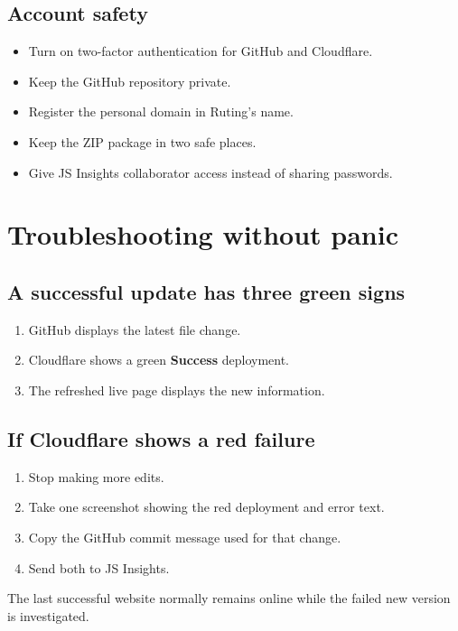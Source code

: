 \documentclass[10pt,a4paper]{article}
\begin{document}
\subsection{Account safety}

\begin{itemize}
  \item Turn on two-factor authentication for GitHub and Cloudflare.
  \item Keep the GitHub repository private.
  \item Register the personal domain in Ruting's name.
  \item Keep the ZIP package in two safe places.
  \item Give JS Insights collaborator access instead of sharing passwords.
\end{itemize}

\clearpage
\section{Troubleshooting without panic}

\subsection{A successful update has three green signs}

\begin{enumerate}
  \item GitHub displays the latest file change.
  \item Cloudflare shows a green \textbf{Success} deployment.
  \item The refreshed live page displays the new information.
\end{enumerate}

\subsection{If Cloudflare shows a red failure}

\begin{tcolorbox}[alert]
\begin{enumerate}
  \item Stop making more edits.
  \item Take one screenshot showing the red deployment and error text.
  \item Copy the GitHub commit message used for that change.
  \item Send both to JS Insights.
\end{enumerate}
The last successful website normally remains online while the failed new version is investigated.
\end{tcolorbox}
\end{document}
